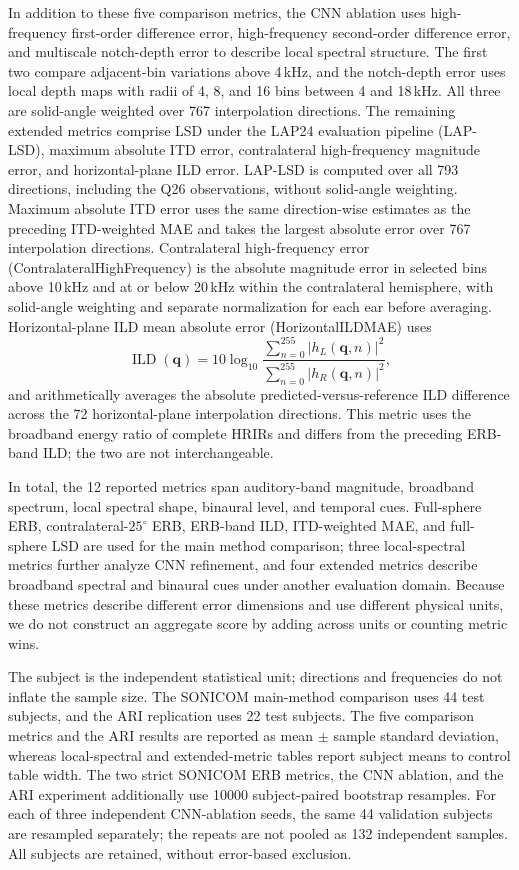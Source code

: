 \documentclass[UTF8,a4paper]{article}
\begin{document}
In addition to these five comparison metrics, the CNN ablation uses high-frequency first-order difference error, high-frequency second-order difference error, and multiscale notch-depth error to describe local spectral structure. The first two compare adjacent-bin variations above 4\,kHz, and the notch-depth error uses local depth maps with radii of 4, 8, and 16 bins between 4 and 18\,kHz. All three are solid-angle weighted over 767 interpolation directions. The remaining extended metrics comprise LSD under the LAP24 evaluation pipeline (LAP-LSD)\cite{R19}, maximum absolute ITD error, contralateral high-frequency magnitude error, and horizontal-plane ILD error. LAP-LSD is computed over all 793 directions, including the Q26 observations, without solid-angle weighting. Maximum absolute ITD error uses the same direction-wise estimates as the preceding ITD-weighted MAE and takes the largest absolute error over 767 interpolation directions. Contralateral high-frequency error (ContralateralHighFrequency) is the absolute magnitude error in selected bins above 10\,kHz and at or below 20\,kHz within the contralateral hemisphere, with solid-angle weighting and separate normalization for each ear before averaging. Horizontal-plane ILD mean absolute error (HorizontalILDMAE) uses
\begin{equation}
\operatorname{ILD}(\mathbf q)=10\log_{10}
\frac{\sum_{n=0}^{255}|h_L(\mathbf q,n)|^2}
     {\sum_{n=0}^{255}|h_R(\mathbf q,n)|^2},
\end{equation}
and arithmetically averages the absolute predicted-versus-reference ILD difference across the 72 horizontal-plane interpolation directions. This metric uses the broadband energy ratio of complete HRIRs and differs from the preceding ERB-band ILD; the two are not interchangeable.

In total, the 12 reported metrics span auditory-band magnitude, broadband spectrum, local spectral shape, binaural level, and temporal cues. Full-sphere ERB, contralateral-$25^\circ$ ERB, ERB-band ILD, ITD-weighted MAE, and full-sphere LSD are used for the main method comparison; three local-spectral metrics further analyze CNN refinement, and four extended metrics describe broadband spectral and binaural cues under another evaluation domain. Because these metrics describe different error dimensions and use different physical units, we do not construct an aggregate score by adding across units or counting metric wins.

The subject is the independent statistical unit; directions and frequencies do not inflate the sample size. The SONICOM main-method comparison uses 44 test subjects, and the ARI replication uses 22 test subjects. The five comparison metrics and the ARI results are reported as mean $\pm$ sample standard deviation, whereas local-spectral and extended-metric tables report subject means to control table width. The two strict SONICOM ERB metrics, the CNN ablation, and the ARI experiment additionally use 10000 subject-paired bootstrap resamples. For each of three independent CNN-ablation seeds, the same 44 validation subjects are resampled separately; the repeats are not pooled as 132 independent samples. All subjects are retained, without error-based exclusion.
\end{document}
